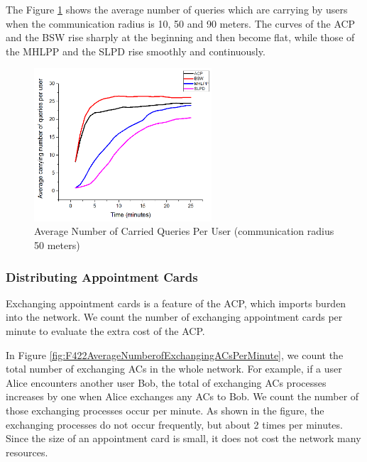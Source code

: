 \documentclass[conference]{IEEEtran}
\begin{document}
The Figure \ref{fig:F420AverageNumberofCarriedQueriesPerUser} shows the average number of queries which are carrying by users when the communication radius is 10, 50 and 90 meters. The curves of the ACP and the BSW rise sharply at the beginning and then become flat, while those of the MHLPP and the SLPD rise smoothly and continuously. 

\begin{figure} [H]
  \centering 
  \includegraphics[width=2.6in]{figures/F420AverageNumberofCarriedQueriesPerUser50.png}
  \caption{Average Number of Carried Queries Per User (communication radius 50 meters)} 
  \label{fig:F420AverageNumberofCarriedQueriesPerUser} %
\end{figure}

\subsubsection{ Distributing Appointment Cards}

Exchanging appointment cards is a feature of the ACP, which imports burden into the network. We count the number of exchanging appointment cards per minute to evaluate the extra cost of the ACP.

In Figure \ref{fig:F422AverageNumberofExchangingACsPerMinute}, we count the total number of exchanging ACs in the whole network. For example, if a user Alice encounters another user Bob, the total of exchanging ACs processes increases by one when Alice exchanges any ACs to Bob. We count the number of those exchanging processes occur per minute. As shown in the figure, the exchanging processes do not occur frequently, but about 2 times per minutes. Since the size of an appointment card is small, it does not cost the network many resources.
\end{document}
